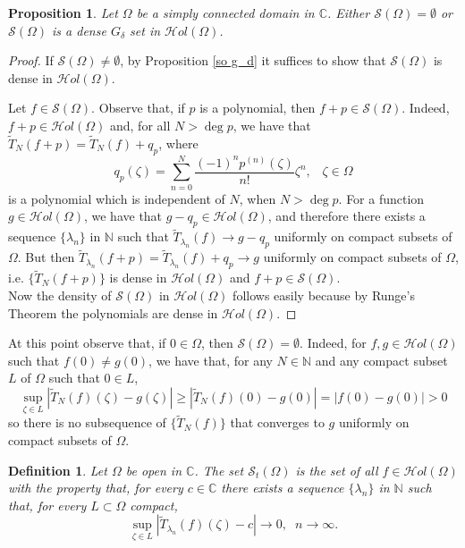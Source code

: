 \documentclass[11pt,twoside,a4paper]{article}
\newtheorem{proposition}[theorem]{Proposition}
\newtheorem{definition}[theorem]{Definition}
\theoremstyle{remark}
\def\d{\delta}
\newcommand{\holo}{{\mathcal Hol}(\Omega)}
\newcommand{\ttn}{\widetilde{T}_N}
\newcommand{\so}{\mathcal{S}(\Omega)}
\newcommand{\ttln}{\widetilde{T}_{\lambda_n}}
\newcommand{\sto}{\mathcal{S}_t(\Omega)}
\begin{document}
\begin{proposition}
  \label{so either or}
  Let $\Omega$ be a simply connected domain in $\mathbb{C}$.
  Either $\so = \emptyset$ or $\so$ is a dense $G_\d$ set in $\holo$.
\end{proposition}
\begin{proof}
  If $\so \neq \emptyset$, by Proposition \ref{so g_d} it suffices to show that $\so$ is dense in $\holo$.
   \par
  Let $f \in \so$. Observe that, if $p$ is a polynomial, then $f+p \in \so$. Indeed, $f+p \in \holo$ and, for all $N> \deg p$, we have that $\ttn(f+p)= \ttn(f)+q_p$, where
  \begin{equation*}
    q_p(\zeta)= \sum_{n=0}^{N}\frac{(-1)^n p^{(n)}(\zeta)}{n!}\zeta ^n, \hspace{10pt} \zeta \in \Omega
  \end{equation*}
  is a polynomial which is independent of $N$, when $N> \deg p$. For a function $g \in \holo$, we have that $g-q_p \in \holo$, and therefore there exists a sequence $\{\lambda_n\}$ in $\mathbb{N}$ such that $\ttln (f) \longrightarrow g- q_p$ uniformly on compact subsets of $\Omega$. But then $\ttln(f+p)=\ttln(f)+q_p \longrightarrow g$ uniformly on compact subsets of $\Omega$, i.e. $\{\ttn(f+p)\}$ is dense in $\holo$ and $f+p \in \so$. \\
  Now the density of $\so$ in $\holo$ follows easily because by Runge's Theorem the polynomials are dense in $\holo$.
\end{proof}
At this point observe that, if $0 \in \Omega$, then $\so = \emptyset$. Indeed, for $f,g \in \holo$ such that $f(0) \neq g(0)$, we have that, for any $N \in \mathbb{N}$ and any compact subset $L$ of $\Omega$ such that $0 \in L$,
\begin{equation*}
  \sup\limits_{\zeta \in L}|\ttn(f)(\zeta)-g(\zeta)| \geq |\ttn(f)(0)-g(0)|=|f(0)-g(0)|>0
\end{equation*}
so there is no subsequence of $\{\ttn(f)\}$ that converges to $g$ uniformly on compact subsets of $\Omega$. \\

\begin{definition}
  Let $\Omega$ be open in $\mathbb{C}$. The set $\sto$ is the set of all $f \in \holo$ with the property that, for every $c \in \mathbb{C}$ there exists a sequence $\{\lambda_n\}$ in $\mathbb{N}$ such that, for every $L \subset \Omega$ compact,
  \begin{equation*}
    \sup\limits_{\zeta \in L }|\widetilde{T}_{\lambda_n}(f)(\zeta)-c| \longrightarrow 0, \hspace{7pt} n \rightarrow \infty.
  \end{equation*}
\end{definition}
\end{document}
